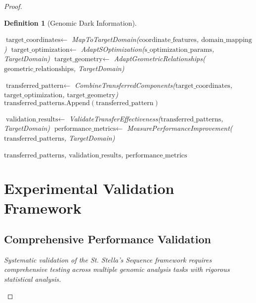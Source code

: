 \documentclass[12pt,a4paper]{article}
\newtheorem{definition}{Definition}
\begin{document}
\begin{proof}
\begin{definition}[Genomic Dark Information]
\begin{algorithm}[H]
\begin{algorithm}[H]
\begin{algorithmic}[1]
        \State $\text{target\_coordinates} \gets$ MapToTargetDomain($\text{coordinate\_features}$, $\text{domain\_mapping}$)
        \State $\text{target\_optimization} \gets$ AdaptSOptimization($\text{s\_optimization\_params}$, TargetDomain)
        \State $\text{target\_geometry} \gets$ AdaptGeometricRelationships($\text{geometric\_relationships}$, TargetDomain)
        
        \State $\text{transferred\_pattern} \gets$ CombineTransferredComponents($\text{target\_coordinates}$, $\text{target\_optimization}$, $\text{target\_geometry}$)
        \State $\text{transferred\_patterns}.\text{Append}(\text{transferred\_pattern})$
    \EndFor
    
    \State $\text{validation\_results} \gets$ ValidateTransferEffectiveness($\text{transferred\_patterns}$, TargetDomain)
    \State $\text{performance\_metrics} \gets$ MeasurePerformanceImprovement($\text{transferred\_patterns}$, TargetDomain)
    
    \State \Return $\text{transferred\_patterns}$, $\text{validation\_results}$, $\text{performance\_metrics}$
\EndProcedure
\end{algorithmic}
\end{algorithm}

\section{Experimental Validation Framework}

\subsection{Comprehensive Performance Validation}

Systematic validation of the St. Stella's Sequence framework requires comprehensive testing across multiple genomic analysis tasks with rigorous statistical analysis.


\end{algorithm}
\end{definition}
\end{proof}
\end{document}
